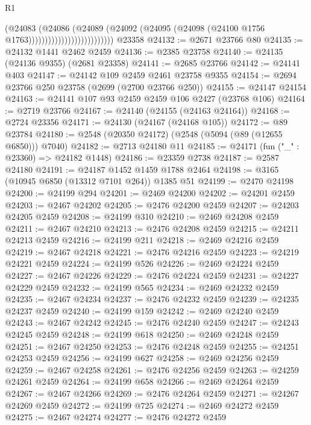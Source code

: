 \begin{lexlean}{R1}
\begin{coremodule}
                                          (@24083
                                            (@24086
                                              (@24089
                                                (@24092
                                                  (@24095
                                                    (@24098
                                                      (@24100 @1756 @1763))))))))))))))))))))))))))
    @23358
@24132 := @2671 @23766 @80
@24135 := @24132 @1441 @2462 @2459
@24136 := @2385 @23758
@24140 := @24135 (@24136 @9355) (@2681 @23358)
@24141 := @2685 @23766
@24142 := @24141 @403
@24147 := @24142 @109 @2459 @2461 @23758 @9355
@24154 := @2694 @23766 @250 @23758 (@2699 (@2700 @23766 @250))
@24155 := @24147 @24154
@24163 := @24141 @107 @93 @2459 @2459 @106 @2427 (@23768 @106)
@24164 := @2719 @23766
@24167 := @24140 (@24155 (@24163 @24164))
@24168 := @2724 @23356
@24171 := @24130 (@24167 (@24168 @105))
@24172 := @89 @23784
@24180 := @2548 (@20350 @24172) (@2548 (@5094 (@89 (@12655 @6850))) @7040)
@24182 := @2713 @24180 @11
@24185 := @24171 (fun ("_" : @23360) => @24182 @1448)
@24186 := @23359 @2738
@24187 := @2587 @24180
@24191 := @24187 @1452 @1459 @1788 @2464
@24198 := @3165 (@10945 @6850 (@13312 @7101 @264)) @1385 @51
@24199 := @2470 @24198
@24200 := @24199 @294
@24201 := @2469 @24200
@24202 := @24201 @2459
@24203 := @2467 @24202
@24205 := @2476 @24200 @2459
@24207 := @24203 @24205 @2459
@24208 := @24199 @310
@24210 := @2469 @24208 @2459
@24211 := @2467 @24210
@24213 := @2476 @24208 @2459
@24215 := @24211 @24213 @2459
@24216 := @24199 @211
@24218 := @2469 @24216 @2459
@24219 := @2467 @24218
@24221 := @2476 @24216 @2459
@24223 := @24219 @24221 @2459
@24224 := @24199 @526
@24226 := @2469 @24224 @2459
@24227 := @2467 @24226
@24229 := @2476 @24224 @2459
@24231 := @24227 @24229 @2459
@24232 := @24199 @565
@24234 := @2469 @24232 @2459
@24235 := @2467 @24234
@24237 := @2476 @24232 @2459
@24239 := @24235 @24237 @2459
@24240 := @24199 @159
@24242 := @2469 @24240 @2459
@24243 := @2467 @24242
@24245 := @2476 @24240 @2459
@24247 := @24243 @24245 @2459
@24248 := @24199 @618
@24250 := @2469 @24248 @2459
@24251 := @2467 @24250
@24253 := @2476 @24248 @2459
@24255 := @24251 @24253 @2459
@24256 := @24199 @627
@24258 := @2469 @24256 @2459
@24259 := @2467 @24258
@24261 := @2476 @24256 @2459
@24263 := @24259 @24261 @2459
@24264 := @24199 @658
@24266 := @2469 @24264 @2459
@24267 := @2467 @24266
@24269 := @2476 @24264 @2459
@24271 := @24267 @24269 @2459
@24272 := @24199 @725
@24274 := @2469 @24272 @2459
@24275 := @2467 @24274
@24277 := @2476 @24272 @2459

\end{coremodule}
\end{lexlean}
